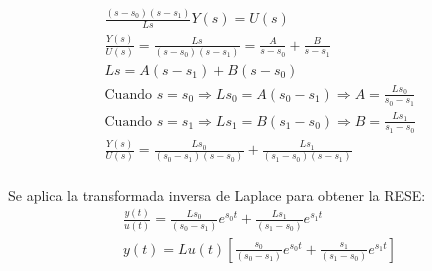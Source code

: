 \begin{align*}
  \frac{(s-s_0)(s-s_1)}{Ls} Y(s) = U(s) \\
  \frac{Y(s)}{U(s)} = \frac{Ls}{(s-s_0)(s-s_1)}  = \frac{A}{s-s_0} + \frac{B}{s-s_1} \\
  Ls  = A(s-s_1) + B(s-s_0) \\
  \text{Cuando } s = s_0 \Rightarrow Ls_0  = A(s_0-s_1) \Rightarrow A = \frac{Ls_0}{s_0-s_1} \\
  \text{Cuando } s = s_1 \Rightarrow Ls_1  = B(s_1-s_0) \Rightarrow B = \frac{Ls_1}{s_1-s_0} \\
  \frac{Y(s)}{U(s)} = \frac{Ls_0}{(s_0-s_1)(s-s_0)} + \frac{Ls_1}{(s_1-s_0)(s-s_1)} \\
\end{align*}

Se aplica la transformada inversa de Laplace para obtener la RESE:
\begin{align*}
  \frac{y(t)}{u(t)} = \frac{Ls_0}{(s_0-s_1)}e^{s_0t} + \frac{Ls_1}{(s_1-s_0)}e^{s_1t} \\
  \tag{RESE}
  y(t) = L u(t) \left[\frac{s_0}{(s_0-s_1)}e^{s_0t} + \frac{s_1}{(s_1-s_0)}e^{s_1t}\right]
\end{align*}
